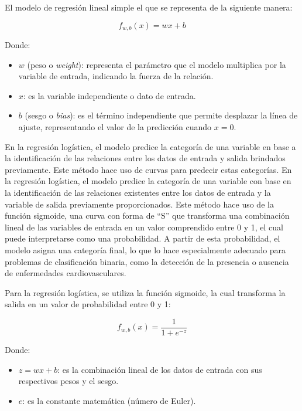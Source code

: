 \documentclass{article}
\begin{document}
        El modelo de regresión lineal simple el que se representa de la siguiente manera:

        \begin{equation}
            f_{w,b}(x) = wx + b
        \end{equation}
        
        Donde:
        \begin{itemize}
            \item $w$ (peso o \textit{weight}): representa el parámetro que el modelo multiplica por la variable de entrada, indicando la fuerza de la relación.
            \item $x$: es la variable independiente o dato de entrada.
            \item $b$ (sesgo o \textit{bias}): es el término independiente que permite desplazar la línea de ajuste, representando el valor de la predicción cuando $x = 0$.
        \end{itemize}

        En la regresión logística, el modelo predice la categoría de una variable en base a la identificación de las relaciones entre los datos de entrada y salida brindados previamente. Este método hace uso de curvas para predecir estas categorías.
        En la regresión logística, el modelo predice la categoría de una variable con base en la identificación de las relaciones existentes entre los datos de entrada y la variable de salida previamente proporcionados. Este método hace uso de la función sigmoide, una curva con forma de “S” que transforma una combinación lineal de las variables de entrada en un valor comprendido entre 0 y 1, el cual puede interpretarse como una probabilidad. A partir de esta probabilidad, el modelo asigna una categoría final, lo que lo hace especialmente adecuado para problemas de clasificación binaria, como la detección de la presencia o ausencia de enfermedades cardiovasculares.

        Para la regresión logística, se utiliza la función sigmoide, la cual transforma la salida en un valor de probabilidad entre 0 y 1:

        \begin{equation}
            f_{w,b}(x) = \frac{1}{1 + e^{-z}}
        \end{equation}
        
        Donde:
        \begin{itemize}
            \item $z = wx + b$: es la combinación lineal de los datos de entrada con sus respectivos pesos y el sesgo.
            \item $e$: es la constante matemática (número de Euler).
        \end{itemize}
\end{document}
